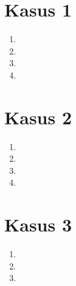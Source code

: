 \documentclass[11pt,a4paper]{article}
\newcommand{\codeListing}[3] {

      


      }
\begin{document}
      \begin{multicols}{2}

        \section*{Kasus 1}
        \begin{enumerate}

          \item \codeListing{1}{1}{0.5}

          \item \codeListing{1}{2}{0.5}

          \item \codeListing{1}{3}{0.5}

          \item \codeListing{1}{4}{0.5}

        \end{enumerate}

        \columnbreak

        \section*{Kasus 2}
        \begin{enumerate}

          \item \codeListing{2}{1}{0.5}

          \item \codeListing{2}{2}{0.5}

          \item \codeListing{2}{3}{0.5}

          \item \codeListing{2}{4}{0.5}

        \end{enumerate}

        \newpage

        \section*{Kasus 3}
        \begin{enumerate}

          \item \codeListing{3}{1}{0.5}

          \item \codeListing{3}{2}{0.5}

          \item \codeListing{3}{3}{0.5}


\end{enumerate}
\end{multicols}
\end{document}
